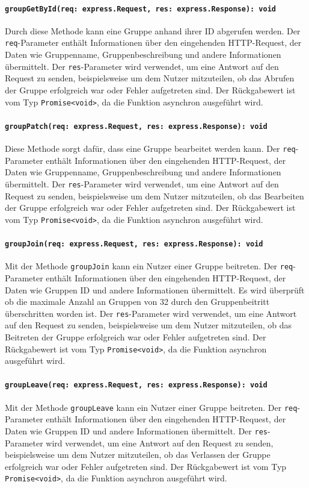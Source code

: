 \documentclass{entwurfsheft}
\begin{document}
\paragraph{\texttt{groupGetById(req: express.Request, res: express.Response): void}}
Durch diese Methode kann eine Gruppe anhand ihrer ID abgerufen werden. Der \texttt{req}-Parameter enthält Informationen über den eingehenden HTTP-Request, der Daten wie Gruppenname, Gruppenbeschreibung und andere Informationen übermittelt. Der \texttt{res}-Parameter wird verwendet, um eine Antwort auf den Request zu senden, beispielsweise um dem Nutzer mitzuteilen, ob das Abrufen der Gruppe erfolgreich war oder Fehler aufgetreten sind.
Der Rückgabewert ist vom Typ \texttt{Promise<void>}, da die Funktion asynchron ausgeführt wird.
\paragraph{\texttt{groupPatch(req: express.Request, res: express.Response): void}}
Diese Methode sorgt dafür, dass eine Gruppe bearbeitet werden kann. Der \texttt{req}-Parameter enthält Informationen über den eingehenden HTTP-Request, der Daten wie Gruppenname, Gruppenbeschreibung und andere Informationen übermittelt. Der \texttt{res}-Parameter wird verwendet, um eine Antwort auf den Request zu senden, beispielsweise um dem Nutzer mitzuteilen, ob das Bearbeiten der Gruppe erfolgreich war oder Fehler aufgetreten sind.
Der Rückgabewert ist vom Typ \texttt{Promise<void>}, da die Funktion asynchron ausgeführt wird.
\paragraph{\texttt{groupJoin(req: express.Request, res: express.Response): void}}
Mit der Methode \texttt{groupJoin} kann ein Nutzer einer Gruppe beitreten. Der \texttt{req}-Parameter enthält Informationen über den eingehenden HTTP-Request, der Daten wie Gruppen ID und andere Informationen übermittelt. Es wird überprüft ob die maximale Anzahl an Gruppen von 32 durch den Gruppenbeitritt überschritten worden ist. Der \texttt{res}-Parameter wird verwendet, um eine Antwort auf den Request zu senden, beispielsweise um dem Nutzer mitzuteilen, ob das Beitreten der Gruppe erfolgreich war oder Fehler aufgetreten sind.
Der Rückgabewert ist vom Typ \texttt{Promise<void>}, da die Funktion asynchron ausgeführt wird.
\paragraph{\texttt{groupLeave(req: express.Request, res: express.Response): void}}
Mit der Methode \texttt{groupLeave} kann ein Nutzer einer Gruppe beitreten. Der \texttt{req}-Parameter enthält Informationen über den eingehenden HTTP-Request, der Daten wie Gruppen ID und andere Informationen übermittelt. Der \texttt{res}-Parameter wird verwendet, um eine Antwort auf den Request zu senden, beispielsweise um dem Nutzer mitzuteilen, ob das Verlassen der Gruppe erfolgreich war oder Fehler aufgetreten sind.
Der Rückgabewert ist vom Typ \texttt{Promise<void>}, da die Funktion asynchron ausgeführt wird.
\end{document}
